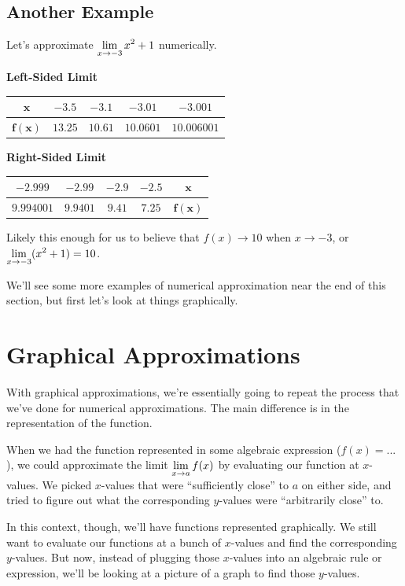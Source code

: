 \subsection*{Another Example}

Let's approximate $\displaystyle \lim_{x\to -3} x^2+1$ numerically.

\textbf{Left-Sided Limit}

\begin{tabular}{ccccc} \toprule
  $\bm{x}$ & $-3.5$ & $-3.1$ & $-3.01$ & $-3.001$ \\ \midrule
  $\bm{f(x)}$ & $13.25$ & $10.61$ & $10.0601$ & $10.006001$\\ \bottomrule
\end{tabular}

\begin{flushright}
  \textbf{Right-Sided Limit}

  \begin{tabular}{ccccc} \toprule
    $-2.999$ & $-2.99$ & $-2.9$ & $-2.5$ & $\bm{x}$ \\ \midrule
    $9.994001$ & $9.9401$ & $9.41$ & $7.25$ & $\bm{f(x)}$ \\ \bottomrule
  \end{tabular}
\end{flushright}

Likely this enough for us to believe that $f(x) \to 10$ when $x\to -3$, or $\displaystyle \lim_{x\to-3} (x^2+1)=10$.

We'll see some more examples of numerical approximation near the end of this section, but first let's look at things graphically.

\section*{Graphical Approximations}

With graphical approximations, we're essentially going to repeat the process that we've done for numerical approximations.
The main difference is in the representation of the function.

When we had the function represented in some algebraic expression ($f(x) = ...$), we could approximate the limit $\displaystyle \lim_{x\to a} f(x)$ by evaluating our function at $x$-values.
We picked $x$-values that were ``sufficiently close'' to $a$ on either side, and tried to figure out what the corresponding $y$-values were ``arbitrarily close'' to.

In this context, though, we'll have functions represented graphically.
We still want to evaluate our functions at a bunch of $x$-values and find the corresponding $y$-values.
But now, instead of plugging those $x$-values into an algebraic rule or expression, we'll be looking at a picture of a graph to find those $y$-values.

